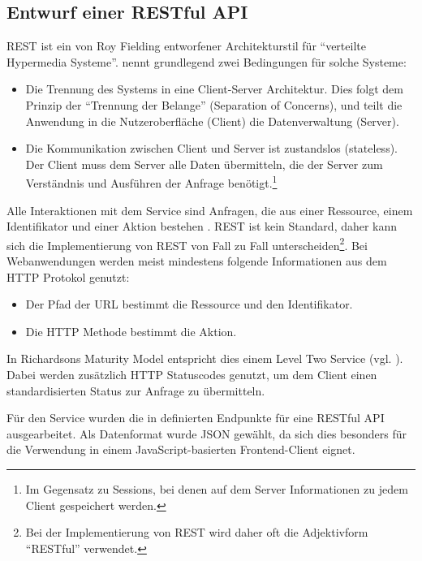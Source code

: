 \subsection{Entwurf einer RESTful API}

\ac{REST} ist ein von Roy Fielding entworfener Architekturstil für ``verteilte Hypermedia Systeme''. \citet{Fielding} nennt grundlegend zwei Bedingungen für solche Systeme:

\begin{itemize}
  \item Die Trennung des Systems in eine Client-Server Architektur. Dies folgt dem Prinzip der ``Trennung der Belange'' (Separation of Concerns), und teilt die Anwendung in die Nutzeroberfläche (Client) die Datenverwaltung (Server).
  \item Die Kommunikation zwischen Client und Server ist zustandslos (stateless). Der Client muss dem Server alle Daten übermitteln, die der Server zum Verständnis und Ausführen der Anfrage benötigt.\footnote{Im Gegensatz zu Sessions, bei denen auf dem Server Informationen zu jedem Client gespeichert werden.}
\end{itemize}

Alle Interaktionen mit dem Service sind Anfragen, die aus einer Ressource, einem Identifikator und einer Aktion bestehen \citep[12]{Webber2010}. \ac{REST} ist kein Standard, daher kann sich die Implementierung von \ac{REST} von Fall zu Fall unterscheiden\footnote{Bei der Implementierung von REST wird daher oft die Adjektivform ``RESTful'' verwendet.}. Bei Webanwendungen werden meist mindestens folgende Informationen aus dem \ac{HTTP} Protokol genutzt:

\begin{itemize}
  \item Der Pfad der \acs{URL} bestimmt die Ressource und den Identifikator.
  \item Die \ac{HTTP} Methode bestimmt die Aktion.
\end{itemize}

In Richardsons Maturity Model entspricht dies einem Level Two Service (vgl. \citep[20]{Webber2010}). Dabei werden zusätzlich HTTP Statuscodes genutzt, um dem Client einen standardisierten Status zur Anfrage zu übermitteln.

Für den Service wurden die in  definierten Endpunkte für eine RESTful API ausgearbeitet. Als Datenformat wurde JSON gewählt, da sich dies besonders für die Verwendung in einem JavaScript-basierten Frontend-Client eignet.

